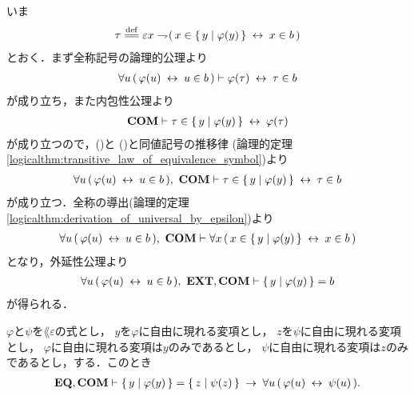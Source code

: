 	\begin{sketch}
		いま
		\begin{align}
			\tau \defeq 
			\varepsilon x \negation (\, x \in \Set{y}{\varphi(y)} \lrarrow x \in b\, )
		\end{align}
		とおく．まず全称記号の論理的公理より
		\begin{align}
			\forall u\, (\, \varphi(u) \hspace{0.25em}\leftrightarrow\hspace{0.25em} u \in b\, )
			\vdash \varphi(\tau) \hspace{0.25em}\leftrightarrow\hspace{0.25em} \tau \in b
			\label{fom:equivalent_formula_rewriting_4_1}
		\end{align}
		が成り立ち，また内包性公理より
		\begin{align}
			\mbox{\bf COM} \vdash \tau \in \{\, y \mid \varphi(y)\, \} \hspace{0.25em}\leftrightarrow\hspace{0.25em} \varphi(\tau)
			\label{fom:equivalent_formula_rewriting_4_2}
		\end{align}
		が成り立つので，()と
		()と同値記号の推移律
		(論理的定理\ref{logicalthm:transitive_law_of_equivalence_symbol})より
		\begin{align}
			\forall u\, (\, \varphi(u) \hspace{0.25em}\leftrightarrow\hspace{0.25em} u \in b\, ),\ \mbox{\bf COM} \vdash
			\tau \in \{\, y \mid \varphi(y)\, \} \hspace{0.25em}\leftrightarrow\hspace{0.25em} \tau \in b
		\end{align}
		が成り立つ．全称の導出(論理的定理\ref{logicalthm:derivation_of_universal_by_epsilon})より
		\begin{align}
			\forall u\, (\, \varphi(u) \hspace{0.25em}\leftrightarrow\hspace{0.25em} u \in b\, ),\ \mbox{\bf COM} \vdash
			\forall x\, (\, x \in \{\, y \mid \varphi(y)\, \} \hspace{0.25em}\leftrightarrow\hspace{0.25em} x \in b\, )
		\end{align}
		となり，外延性公理より
		\begin{align}
			\forall u\, (\, \varphi(u) \lrarrow u \in b\, ),\ \EXTAX,\COMAX \vdash
			\Set{y}{\varphi(y)} = b
		\end{align}
		が得られる．
		\QED
	\end{sketch}
	
	\begin{screen}
		\begin{thm}
		\label{thm:equivalent_formula_rewriting_5}
			$\varphi$と$\psi$を$\lang{\varepsilon}$の式とし，
			$y$を$\varphi$に自由に現れる変項とし，
			$z$を$\psi$に自由に現れる変項とし，
			$\varphi$に自由に現れる変項は$y$のみであるとし，
			$\psi$に自由に現れる変項は$z$のみであるとし，する．このとき
			\begin{align}
				\mbox{{\bf EQ}},\mbox{\bf COM} \vdash \{\, y \mid \varphi(y)\, \} = \{\, z \mid \psi(z)\, \}
				\hspace{0.25em}\rightarrow\hspace{0.25em} \forall u\, (\, \varphi(u) \hspace{0.25em}\leftrightarrow\hspace{0.25em} \psi(u)\, ).
			\end{align}
		\end{thm}
	\end{screen}
	
